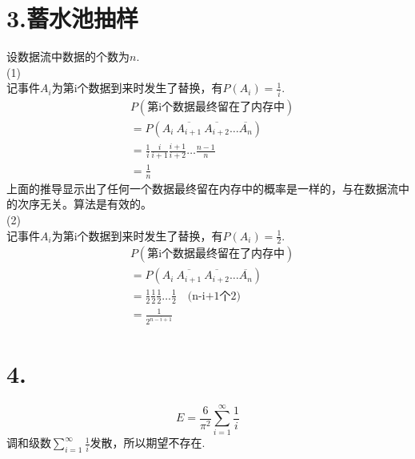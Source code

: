 \documentclass[a4paper,twocolumn]{ctexart}
\begin{document}
\section*{3.蓄水池抽样}
\noindent 设数据流中数据的个数为$n$.\\
\noindent (1)\\
记事件$A_i$为第i个数据到来时发生了替换，有$P(A_i)=\frac{1}{i}$.\\
\begin{align*}
&P(\text{第i个数据最终留在了内存中})\\
&=P(A_i~\overline{A_{i+1}}~\overline{A_{i+2}}\ldots\overline{A_{n}})\\
&=\frac{1}{i}\frac{i}{i+1}\frac{i+1}{i+2}\ldots\frac{n-1}{n}\\
&=\frac{1}{n}
\end{align*}
上面的推导显示出了任何一个数据最终留在内存中的概率是一样的，与在数据流中的次序无关。算法是有效的。\\
\noindent(2)\\
记事件$A_i$为第i个数据到来时发生了替换，有$P(A_i)=\frac{1}{2}$.\\
\begin{align*}
&P(\text{第i个数据最终留在了内存中})\\
&=P(A_i~\overline{A_{i+1}}~\overline{A_{i+2}}\ldots\overline{A_{n}})\\
&=\frac{1}{2}\frac{1}{2}\frac{1}{2}\ldots\frac{1}{2}\text{~~~(n-i+1个2)}\\
&=\frac{1}{2^{n-i+1}}
\end{align*}

\section*{4.}
\[
E=\frac{6}{\pi^2}\sum_{i=1}^{\infty}\frac{1}{i}
\]
调和级数$\sum_{i=1}^{\infty}\frac{1}{i}$发散，所以期望不存在.
\end{document}
